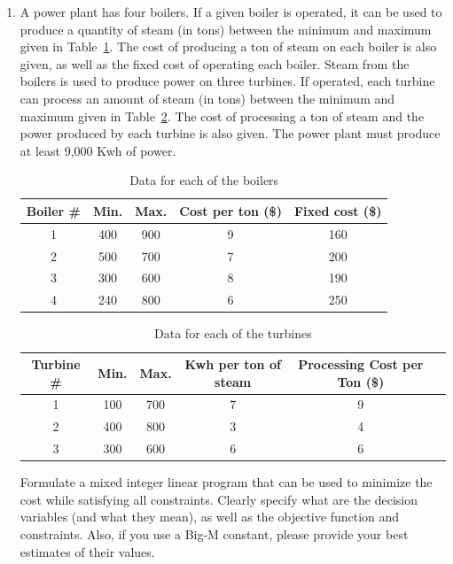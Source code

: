 \documentclass{article}
\begin{document}
\begin{enumerate}
\begin{itemize}
Next, we express $p = 1 \Rightarrow \delta_{27} + \delta_{35} + \delta_{79} \leq 1$:
\[
\delta_{27} + \delta_{35} + \delta_{79} \leq 1 + 2(1-p) = 3 - 2p.
\]
$p = 1 \Rightarrow \delta_{27} + \delta_{35} + \delta_{79} \leq 1$, and $p = 0 \Rightarrow \delta_{27} + \delta_{35} + \delta_{79} \leq 3$ (nonbinding since each $\delta_i \leq 1$).

\end{itemize}

 
\item A power plant has four boilers. If a given boiler is operated, it can be used to produce a quantity of steam (in tons) between the minimum and maximum given in Table~\ref{tabboiler}. The cost of producing a ton of steam on each boiler is also given, as well as the fixed cost of operating each boiler. Steam from the boilers is used to produce power on three turbines. If operated, each turbine can process an amount of steam (in tons) between the minimum and maximum given in Table~\ref{tabturbine}. The cost of processing a ton of steam and the power produced by each turbine is also given. The power plant must produce at least 9,000 Kwh of power.

\begin{table}[h!]
\begin{center}
\begin{tabular}{ccccc} \hline
Boiler \# & Min. & Max. & Cost per ton (\$) & Fixed cost (\$)
\\ \hline
1 & 400 & 900 & 9 & 160 \\
2 & 500 & 700 & 7 & 200 \\
3 & 300 & 600 & 8 & 190 \\
4 & 240 & 800 & 6 & 250 \\ \hline
\end{tabular}
\end{center} \caption{Data for each of the boilers} \label{tabboiler}
\end{table}

\begin{table}[h!]
\begin{center}
\begin{tabular}{cccccc} \hline
Turbine \# & Min. & Max. & Kwh per ton of steam & Processing Cost
per Ton (\$)  \\ \hline
1 & 100 & 700 & 7 & 9  \\
2 & 400 & 800 & 3 & 4  \\
3 & 300 & 600 & 6 & 6  \\ \hline
\end{tabular}
\end{center} \caption{Data for each of the turbines}
\label{tabturbine}
\end{table}
Formulate a mixed integer linear program that can be used to minimize the cost while satisfying all constraints. Clearly specify what are the decision variables (and what they mean), as well as the objective function and constraints. Also, if you use a Big-M constant,  please provide your best estimates of their values.


\end{enumerate}
\end{document}
